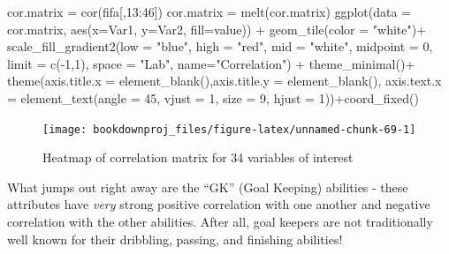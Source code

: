 \documentclass[
]{article}
\newenvironment{Shaded}{\begin{snugshade}}{\end{snugshade}}
\newcommand{\AttributeTok}[1]{\textcolor[rgb]{0.77,0.63,0.00}{#1}}
\newcommand{\DecValTok}[1]{\textcolor[rgb]{0.00,0.00,0.81}{#1}}
\newcommand{\FunctionTok}[1]{\textcolor[rgb]{0.00,0.00,0.00}{#1}}
\newcommand{\NormalTok}[1]{#1}
\newcommand{\OtherTok}[1]{\textcolor[rgb]{0.56,0.35,0.01}{#1}}
\newcommand{\SpecialCharTok}[1]{\textcolor[rgb]{0.00,0.00,0.00}{#1}}
\newcommand{\StringTok}[1]{\textcolor[rgb]{0.31,0.60,0.02}{#1}}
\theoremstyle{definition}
\theoremstyle{definition}
\theoremstyle{definition}
\theoremstyle{definition}
\theoremstyle{remark}
\begin{document}
\begin{Shaded}
\begin{Highlighting}[]
\NormalTok{cor.matrix }\OtherTok{=} \FunctionTok{cor}\NormalTok{(fifa[,}\DecValTok{13}\SpecialCharTok{:}\DecValTok{46}\NormalTok{])}
\NormalTok{cor.matrix }\OtherTok{=} \FunctionTok{melt}\NormalTok{(cor.matrix)}
\FunctionTok{ggplot}\NormalTok{(}\AttributeTok{data =}\NormalTok{ cor.matrix, }\FunctionTok{aes}\NormalTok{(}\AttributeTok{x=}\NormalTok{Var1, }\AttributeTok{y=}\NormalTok{Var2, }\AttributeTok{fill=}\NormalTok{value)) }\SpecialCharTok{+} 
  \FunctionTok{geom\_tile}\NormalTok{(}\AttributeTok{color =} \StringTok{"white"}\NormalTok{)}\SpecialCharTok{+}
  \FunctionTok{scale\_fill\_gradient2}\NormalTok{(}\AttributeTok{low =} \StringTok{"blue"}\NormalTok{, }\AttributeTok{high =} \StringTok{"red"}\NormalTok{, }\AttributeTok{mid =} \StringTok{"white"}\NormalTok{, }
   \AttributeTok{midpoint =} \DecValTok{0}\NormalTok{, }\AttributeTok{limit =} \FunctionTok{c}\NormalTok{(}\SpecialCharTok{{-}}\DecValTok{1}\NormalTok{,}\DecValTok{1}\NormalTok{), }\AttributeTok{space =} \StringTok{"Lab"}\NormalTok{, }
    \AttributeTok{name=}\StringTok{"Correlation"}\NormalTok{) }\SpecialCharTok{+}  \FunctionTok{theme\_minimal}\NormalTok{()}\SpecialCharTok{+} 
      \FunctionTok{theme}\NormalTok{(}\AttributeTok{axis.title.x =} \FunctionTok{element\_blank}\NormalTok{(),}\AttributeTok{axis.title.y =} \FunctionTok{element\_blank}\NormalTok{(),}
            \AttributeTok{axis.text.x =} \FunctionTok{element\_text}\NormalTok{(}\AttributeTok{angle =} \DecValTok{45}\NormalTok{, }\AttributeTok{vjust =} \DecValTok{1}\NormalTok{, }
        \AttributeTok{size =} \DecValTok{9}\NormalTok{, }\AttributeTok{hjust =} \DecValTok{1}\NormalTok{))}\SpecialCharTok{+}\FunctionTok{coord\_fixed}\NormalTok{()}
\end{Highlighting}
\end{Shaded}

\begin{figure}

{\centering \texttt{[image: bookdownproj\_files/figure-latex/unnamed-chunk-69-1]} 

}

\caption{Heatmap of correlation matrix for 34 variables of interest}\label{fig:unnamed-chunk-69}
\end{figure}

What jumps out right away are the ``GK'' (Goal Keeping) abilities - these attributes have \emph{very} strong positive correlation with one another and negative correlation with the other abilities. After all, goal keepers are not traditionally well known for their dribbling, passing, and finishing abilities!
\end{document}
